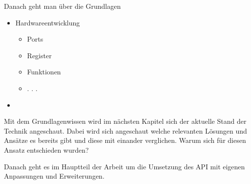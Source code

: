 Danach geht man über die Grundlagen
	\begin{itemize}
		\item Hardwareentwicklung
		\begin{itemize}
			\item Ports
			\item Register
			\item Funktionen
			\item . . .
		\end{itemize}
		\item 
	\end{itemize}

Mit dem Grundlagenwissen wird im nächsten Kapitel sich der aktuelle Stand der Technik angeschaut.
Dabei wird sich angeschaut welche relevanten Lösungen und Ansätze es bereits gibt und diese mit einander verglichen.
Warum sich für diesen Ansatz entschieden wurden?

Danach geht es im Hauptteil der Arbeit um die Umsetzung des API mit eigenen Anpassungen und Erweiterungen.








